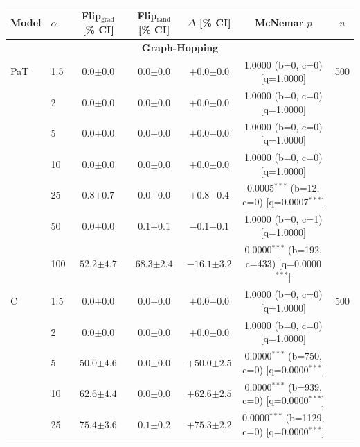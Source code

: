 \begin{table}[h!]
\centering
\tiny
\setlength{\tabcolsep}{4pt}
\begin{tabular}{l l cccc c}
\toprule
Model & $\alpha$ & Flip$_{\text{grad}}$ [\% CI] & Flip$_{\text{rand}}$ [\% CI] & $\Delta$ [\% CI] & McNemar $p$ & $n$ \\
\midrule
\multicolumn{7}{c}{\textbf{Graph-Hopping}} \\
\midrule
PaT & 1.5 & $0.0 {\scriptstyle \pm 0.0}$ & $0.0 {\scriptstyle \pm 0.0}$ & $+0.0 {\scriptstyle \pm 0.0}$ & 1.0000 (b=0, c=0) [q=1.0000] & 500 \\
 & 2 & $0.0 {\scriptstyle \pm 0.0}$ & $0.0 {\scriptstyle \pm 0.0}$ & $+0.0 {\scriptstyle \pm 0.0}$ & 1.0000 (b=0, c=0) [q=1.0000] &  \\
 & 5 & $0.0 {\scriptstyle \pm 0.0}$ & $0.0 {\scriptstyle \pm 0.0}$ & $+0.0 {\scriptstyle \pm 0.0}$ & 1.0000 (b=0, c=0) [q=1.0000] &  \\
 & 10 & $0.0 {\scriptstyle \pm 0.0}$ & $0.0 {\scriptstyle \pm 0.0}$ & $+0.0 {\scriptstyle \pm 0.0}$ & 1.0000 (b=0, c=0) [q=1.0000] &  \\
 & 25 & $0.8 {\scriptstyle \pm 0.7}$ & $0.0 {\scriptstyle \pm 0.0}$ & $+0.8 {\scriptstyle \pm 0.4}$ & 0.0005$^{***}$ (b=12, c=0) [q=0.0007$^{***}$] &  \\
 & 50 & $0.0 {\scriptstyle \pm 0.0}$ & $0.1 {\scriptstyle \pm 0.1}$ & $-0.1 {\scriptstyle \pm 0.1}$ & 1.0000 (b=0, c=1) [q=1.0000] &  \\
 & 100 & $52.2 {\scriptstyle \pm 4.7}$ & $68.3 {\scriptstyle \pm 2.4}$ & $-16.1 {\scriptstyle \pm 3.2}$ & 0.0000$^{***}$ (b=192, c=433) [q=0.0000$^{***}$] &  \\
\midrule
C & 1.5 & $0.0 {\scriptstyle \pm 0.0}$ & $0.0 {\scriptstyle \pm 0.0}$ & $+0.0 {\scriptstyle \pm 0.0}$ & 1.0000 (b=0, c=0) [q=1.0000] & 500 \\
 & 2 & $0.0 {\scriptstyle \pm 0.0}$ & $0.0 {\scriptstyle \pm 0.0}$ & $+0.0 {\scriptstyle \pm 0.0}$ & 1.0000 (b=0, c=0) [q=1.0000] &  \\
 & 5 & $50.0 {\scriptstyle \pm 4.6}$ & $0.0 {\scriptstyle \pm 0.0}$ & $+50.0 {\scriptstyle \pm 2.5}$ & 0.0000$^{***}$ (b=750, c=0) [q=0.0000$^{***}$] &  \\
 & 10 & $62.6 {\scriptstyle \pm 4.4}$ & $0.0 {\scriptstyle \pm 0.0}$ & $+62.6 {\scriptstyle \pm 2.5}$ & 0.0000$^{***}$ (b=939, c=0) [q=0.0000$^{***}$] &  \\
 & 25 & $75.4 {\scriptstyle \pm 3.6}$ & $0.1 {\scriptstyle \pm 0.2}$ & $+75.3 {\scriptstyle \pm 2.2}$ & 0.0000$^{***}$ (b=1129, c=0) [q=0.0000$^{***}$] &  \\

\end{tabular}
\end{table}
